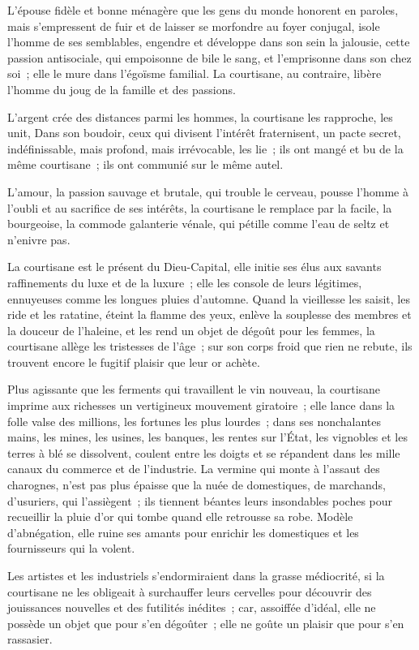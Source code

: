 \documentclass[french,twoside]{book} %
\begin{document}
\noindent L'épouse fidèle et bonne ménagère que les gens du monde honorent en paroles, mais s’empressent de fuir et de laisser se morfondre au foyer conjugal, isole l’homme de ses semblables, engendre et développe dans son sein la jalousie, cette passion antisociale, qui empoisonne de bile le sang, et l’emprisonne dans son chez soi ; elle le mure dans l’égoïsme familial. La courtisane, au contraire, libère l’homme du joug de la famille et des passions.\par
L'argent crée des distances parmi les hommes, la courtisane les rapproche, les unit, Dans son boudoir, ceux qui divisent l’intérêt fraternisent, un pacte secret, indéfinissable, mais profond, mais irrévocable, les lie ; ils ont mangé et bu de la même courtisane ; ils ont communié sur le même autel.\par
L'amour, la passion sauvage et brutale, qui trouble le cerveau, pousse l’homme à l’oubli et au sacrifice de ses intérêts, la courtisane le remplace par la facile, la bourgeoise, la commode galanterie vénale, qui pétille comme l’eau de seltz et n’enivre pas.\par
La courtisane est le présent du Dieu-Capital, elle initie ses élus aux savants raffinements du luxe et de la luxure ; elle les console de leurs légitimes, ennuyeuses comme les longues pluies d’automne. Quand la vieillesse les saisit, les ride et les ratatine, éteint la flamme des yeux, enlève la souplesse des membres et la douceur de l’haleine, et les rend un objet de dégoût pour les femmes, la courtisane allège les tristesses de l’âge ; sur son corps froid que rien ne rebute, ils trouvent encore le fugitif plaisir que leur or achète.\par
Plus agissante que les ferments qui travaillent le vin nouveau, la courtisane imprime aux richesses un vertigineux mouvement giratoire ; elle lance dans la folle valse des millions, les fortunes les plus lourdes ; dans ses nonchalantes mains, les mines, les usines, les banques, les rentes sur l’État, les vignobles et les terres à blé se dissolvent, coulent entre les doigts et se répandent dans les mille canaux du commerce et de l’industrie. La vermine qui monte à l’assaut des charognes, n’est pas plus épaisse que la nuée de domestiques, de marchands, d’usuriers, qui l’assiègent ; ils tiennent béantes leurs insondables poches pour recueillir la pluie d’or qui tombe quand elle retrousse sa robe. Modèle d’abnégation, elle ruine ses amants pour enrichir les domestiques et les fournisseurs qui la volent.\par
Les artistes et les industriels s’endormiraient dans la grasse médiocrité, si la courtisane ne les obligeait à surchauffer leurs cervelles pour découvrir des jouissances nouvelles et des futilités inédites ; car, assoiffée d’idéal, elle ne possède un objet que pour s’en dégoûter ; elle ne goûte un plaisir que pour s’en rassasier.\par
\end{document}
